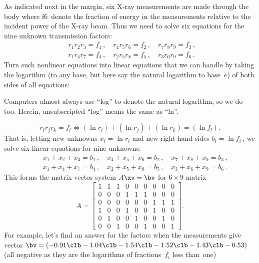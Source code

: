 \begin{example}
As indicated next in the margin, six X-ray measurements are made through the body where \hlist f6\ denote the fraction of energy in the measurements relative to the incident power of the X-ray beam.
%
Thus we need to solve six equations for the nine unknown transmission factors:
\begin{eqnarray*}
&&
r_1r_2r_3=f_1\,,\quad
r_4r_5r_6=f_2\,,\quad
r_7r_8r_9=f_3\,,\quad
\\&&
r_1r_4r_7=f_4\,,\quad
r_2r_5r_8=f_5\,,\quad
r_3r_6r_9=f_6\,.\quad
\end{eqnarray*}
Turn such nonlinear equations into linear equations that we can handle by taking the logarithm (to any base, but here say the natural logarithm to base~\(e\)) of both sides of all equations:
\begin{aside}
Computers almost always use ``log'' to denote the natural logarithm, so we do too.  Herein, unsubscripted ``log'' means the same as ``ln''.
\end{aside}
\begin{equation*}
r_ir_jr_k=f_l \iff (\ln r_i)+(\ln r_j)+(\ln r_k)=(\ln f_l).
\end{equation*}
That is, letting new unknowns \(x_i=\ln r_i\) and new right-hand sides \(b_i=\ln f_i\)\,, we solve six linear equations for nine unknowns:
\begin{eqnarray*}&&
x_1+x_2+x_3=b_1\,,\quad
x_4+x_5+x_6=b_2\,,\quad
x_7+x_8+x_9=b_3\,,
\\&&
x_1+x_4+x_7=b_4\,,\quad
x_2+x_5+x_8=b_5\,,\quad
x_3+x_6+x_9=b_6\,.
\end{eqnarray*}
This forms the matrix-vector system \(A\xv=\bv\) for \(6\times9\) matrix
\begin{equation*}
A=\begin{bmatrix} 
 1&1&1&0&0&0&0&0&0 \\
 0&0&0&1&1&1&0&0&0 \\
 0&0&0&0&0&0&1&1&1 \\
 1&0&0&1&0&0&1&0&0 \\
 0&1&0&0&1&0&0&1&0 \\
 0&0&1&0&0&1&0&0&1 \end{bmatrix}.
\end{equation*}
For example, let's find an answer for the factors when the measurements give vector \(\bv=(-0.91\clb -1.04\clb -1.54\clb -1.52\clb -1.43\clb -0.53)\) (all negative as they are the logarithms of fractions~\(f_i\) less than~one)
\setbox\ajrqrbox\hbox{\qrcode{%
A=[1 1 1 0 0 0 0 0 0 
 0 0 0 1 1 1 0 0 0 
 0 0 0 0 0 0 1 1 1
}}
\end{example}
